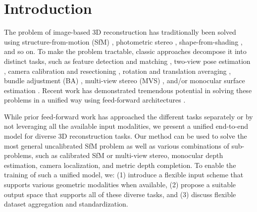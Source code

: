 \vspace{-1em}
\section{Introduction}
\label{sec:intro}

The problem of image-based 3D reconstruction has traditionally been solved using
structure-from-motion (SfM) \cite{SchoenF2016, PanBPS2024},
photometric stereo \cite{Woodh1980},
shape-from-shading \cite{horn1989obtaining},
and so on.
To make the problem tractable, classic approaches
decompose it into distinct tasks, such as
feature detection \cite{Lowe2004} and matching \cite{SarliDMR2020},
two-view pose estimation \cite{Niste2004},
camera calibration \cite{VeichSLP2024} and resectioning \cite{SattlLK2011},
rotation \cite{HartlTDL2013} and translation averaging \cite{PanBPS2024},
bundle adjustment (BA) \cite{TriggMHF2000}, multi-view stereo (MVS) \cite{SchoenZFP2016},
and/or monocular surface estimation \cite{HoiemEH2005a}.
Recent work has demonstrated tremendous potential in solving these problems in a unified way using feed-forward architectures \cite{WangLCCR2024, LeroyCR2024, ZhangLKYRT2024, WangTBXLSWXZ2024, IzquiSFGTCABW2025, DongWLCFKY2025}.

While prior feed-forward work has approached the different tasks separately or by not leveraging all the available input modalities, we present a unified end-to-end model for diverse 3D reconstruction tasks.
Our method \coolname can be used to solve the most general uncalibrated SfM problem as well as various combinations of sub-problems, such as calibrated SfM or multi-view stereo, monocular depth estimation, camera localization, and metric depth completion.
To enable the training of such a unified model, we:
(1) introduce a flexible input scheme that supports various geometric modalities when available,
(2) propose a suitable output space that supports all of these diverse tasks, and
(3) discuss flexible dataset aggregation and standardization.


